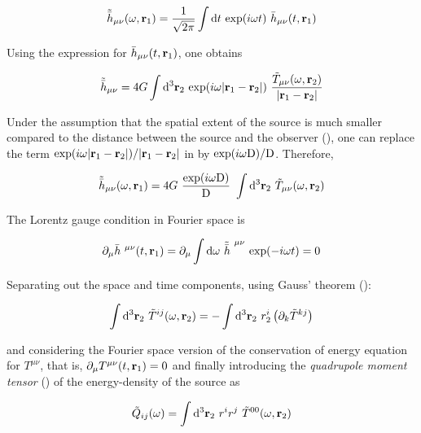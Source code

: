 \documentclass[epsf]{article}
\begin{document}
\begin{equation}
{\tilde{\bar{h}}}_{\mu\nu} (\omega, {\bf r}_1) = \frac{1}{\sqrt{2\pi}}\int {\rm d}t~{\rm exp}
(i\omega t)~\bar{h}_{\mu\nu}(t, {\bf r}_1)
\end{equation}

Using the expression for $\bar{h}_{\mu\nu} (t, {\bf r}_1)$, one obtains

\begin{equation}
{\tilde{\bar{h}}}_{\mu\nu} = 4G\int {\rm d}^3 {\bf r}_2 ~{\rm exp}(i\omega |{\bf r}_1 - 
{\bf r}_2|)~\frac{\tilde{T}_{\mu\nu}(\omega, {\bf r}_2)}{|{\bf r}_1 - {\bf r}_2|}
\end{equation}

Under the assumption that the spatial extent of the source is much smaller
compared to the distance between the source and the observer (\cite{maggiore,chaky,ian}), one can replace
the term ${\rm exp}(i\omega |{\bf r}_1 - {\bf r}_2|)/|{\bf r}_1 - {\bf r}_2|$ 
in by ${\rm exp}(i\omega{\rm D})/{\rm D}$. Therefore,

\begin{equation}
\tilde{\bar{h}}_{\mu\nu}(\omega, {\bf r}_1) = 4G~\frac{{\rm exp}(i\omega
{\rm D})}{{\rm D}}~\int {\rm d}^3 {\bf r}_2~\tilde{T}_{\mu\nu}(\omega, {\bf r}_2)
\end{equation}

The Lorentz gauge condition in Fourier space is 

\begin{equation}
\partial_{\mu}\bar{h}^{~\mu\nu}(t, {\bf r}_1) = \partial_{\mu}\int {\rm d}\omega~
{\tilde{\bar{h}}}^{~\mu\nu}~{\rm exp}(-i\omega t) = 0
\end{equation}

Separating out the space and time components, using Gauss' theorem (\cite{maggiore,chaky}): 

\begin{equation}
\int {\rm d}^3 {\bf r}_2~\tilde{T}^{ij}(\omega, {\bf r}_2) = - \int {\rm d}^3 {\bf r}_2~r_2^{i} \left(\partial_k \tilde{T}^{kj}\right)
\end{equation}	

and considering the Fourier space version of the conservation of energy equation for 
$T^{\mu\nu}$, that is, $\partial_{\mu} T^{\mu\nu}(t, {\bf r}_1) = 0$ and finally introducing the {\it quadrupole moment tensor} (\cite{schutz,maggiore,chaky,ian}) of the energy-density of the source as

\begin{equation}
\tilde{Q}_{ij}(\omega) = \int {\rm d}^3 {\bf r}_2~r^{i}r^{j}~\tilde{T}^{00}(\omega, {\bf r}_2)
\end{equation}
\end{document}
